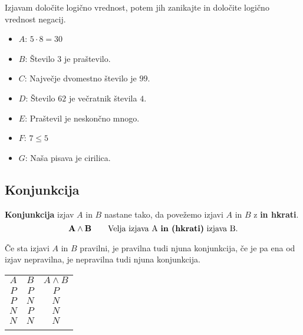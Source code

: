          
             \begin{naloga}
                Izjavam določite logično vrednost, potem jih zanikajte in določite logično vrednost negacij.
                \begin{itemize}
                    \item $A$: $5 \cdot 8 = 30$
                    \item $B$: Število $3$ je praštevilo.
                    \item $C$: Največje dvomestno število je $99$.
                    \item $D$: Število $62$ je večratnik števila $4$.
                    \item $E$: Praštevil je neskončno mnogo.
                    \item $F$: $7 \leq 5$
                    \item $G$: Naša pisava je cirilica.
                \end{itemize}
            \end{naloga}
         

         
             \subsection{Konjunkcija}
                \textbf{Konjunkcija} izjav $A$ in $B$ nastane tako, da povežemo izjavi $A$ in $B$ 
                z \textbf{in hkrati}.
                $$ \mathbf{A\land B} \quad \quad \textmd{Velja izjava A \textbf{in (hkrati)} izjava B.}$$
             
                        Če sta izjavi $A$ in $B$ pravilni, je pravilna tudi njuna konjunkcija, 
                        če je pa ena od izjav nepravilna, je nepravilna tudi njuna konjunkcija.
                     

                    \begin{table}[H]
                        \centering
                        \begin{tabular}{||c|c|c||} 
                        \hhline{|t:===:t|}
                        \rowcolor[rgb]{0.843,0.718,0.718} $A$ & $B$ & $A\land B$  \\ 
                        \hhline{|:===:|}
                        $P$ & $P$ & $P$                         \\ 
                        \hline
                        $P$ & $N$ & $N$                         \\ 
                        \hline
                        $N$ & $P$ & $N$                         \\ 
                        \hline
                        $N$ & $N$ & $N$                         \\
                        \hhline{|b:===:b|}
                        \end{tabular}
                    \end{table}



